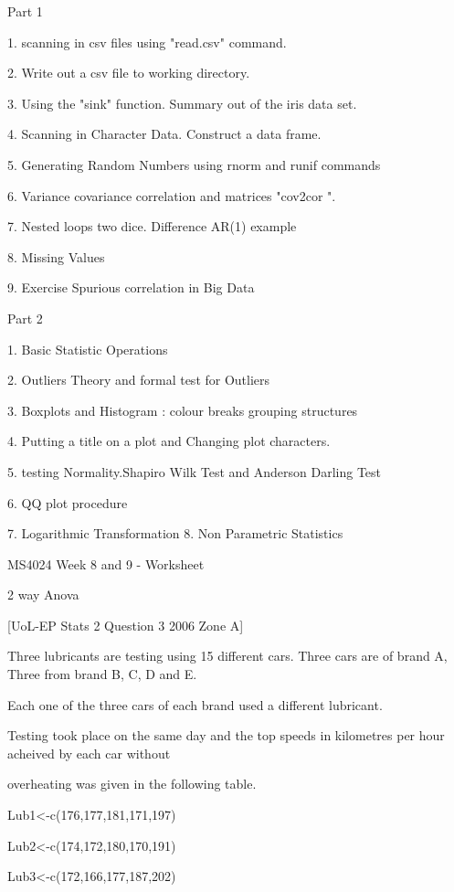 
Part 1


1. scanning in csv files using "read.csv" command.

2. Write out a csv file to working directory.

3. Using the "sink" function. Summary out of the iris data set.

4. Scanning in Character Data. Construct a data frame.

5. Generating Random Numbers using rnorm and runif commands

6. Variance covariance correlation and matrices "cov2cor ".

7. Nested loops two dice. Difference AR(1) example

8. Missing Values

 9. Exercise Spurious correlation in Big Data

Part 2

1. Basic Statistic Operations

2. Outliers Theory and formal test for Outliers

3. Boxplots and Histogram : colour breaks grouping structures

 4.  Putting a title on a plot and Changing plot characters.

5. testing Normality.Shapiro Wilk Test and Anderson Darling Test

6. QQ plot procedure

7. Logarithmic Transformation
8. Non Parametric Statistics

MS4024 Week 8 and 9 - Worksheet

2 way Anova


[UoL-EP Stats 2 Question 3 2006 Zone A]


Three lubricants are testing using 15 different cars. Three cars are of brand A, Three from brand B, C, D and E.


Each one of the three cars of each brand used a different lubricant.


Testing took place on the same day and the top speeds in kilometres per hour acheived by each car without

overheating was given in the following table.


Lub1<-c(176,177,181,171,197)

Lub2<-c(174,172,180,170,191)

Lub3<-c(172,166,177,187,202)


